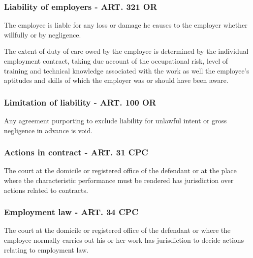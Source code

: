 \subsubsection{Liability of employers - ART. 321 OR}
\begin{compactenum}
	\item The employee is liable for any loss or damage he causes to the employer whether willfully or by negligence.
	\item The extent of duty of care owed by the employee is determined by the individual employment contract, taking due account of the occupational risk, level of training and technical knowledge associated with the work as well the employee’s aptitudes and skills of which the employer was or should have been aware.
\end{compactenum}

\subsubsection{Limitation of liability - ART. 100 OR}
\begin{compactenum}
	\item Any agreement purporting to exclude liability for unlawful intent or gross negligence in advance is void.
\end{compactenum}

\subsubsection{Actions in contract - ART. 31 CPC}
The court at the domicile or registered office of the defendant or at the place where the characteristic performance must be rendered has jurisdiction over actions related to contracts.

\subsubsection{Employment law - ART. 34 CPC}
The court at the domicile or registered office of the defendant or where the employee normally carries out his or her work has jurisdiction to decide actions relating to employment law.